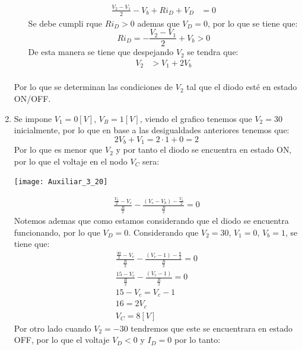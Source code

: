 \documentclass[
  11pt,
  letterpaper,
   addpoints,
   answers
  ]{exam}
\begin{document}
\begin{questions}
\begin{solution}
\begin{enumerate}
\begin{itemize}
\begin{align}
            \frac{V_{2}- V_{1}}{2} - V_{b} + Ri_{D} +V_{D}&= 0
        \end{align} 
        Se debe cumpli rque $Ri_{D} > 0 $ ademas que $V_{D} = 0$, por lo que se tiene que:
        \begin{equation}
            Ri_{D} = -\frac{V_{2}- V_{1}}{2} + V_{b} > 0 
        \end{equation}
        De esta manera se tiene que despejando $V_{2}$ se tendra que:
        \begin{align}
            V_{2} &> V_{1} + 2V_{b}\\
        \end{align}
    \end{itemize}
    Por lo que se determinan las condiciones de $V_2$ tal que el diodo esté en estado ON/OFF.
    \item Se impone $V_1 = 0 [V]$, $V_B = 1 [V]$, viendo el grafico tenemos que $V_{2}= 30$ inicialmente, por lo que en base a las desigualdades anteriores tenemos que:
    \begin{equation}
        2V_{b} + V_{1} = 2 \cdot 1 + 0 = 2 
    \end{equation}
    Por lo que es menor que $V_{2}$ y por tanto el diodo se encuentra en estado ON, por lo que el voltaje en el nodo $V_{C}$ sera:
    \begin{center}
        \texttt{[image: Auxiliar\_3\_20]}
    \end{center}
    \begin{align}
        \frac{\frac{V_{2}}{2}-V_{c}}{\frac{R}{2}} - \frac{(V_{c} - V_{b}) - \frac{V_{1}}{2}}{\frac{R}{2}}=0
    \end{align}
    Notemos ademas que como estamos considerando que el diodo se encuentra funcionando, por lo que $V_{D} = 0$. Considerando que $V_{2} = 30$, $V_{1} = 0$, $V_{b} = 1$, se tiene que:
    \begin{align}
        \frac{\frac{30}{2}-V_{c}}{\frac{R}{2}} - \frac{(V_{c} - 1) - \frac{0}{2}}{\frac{R}{2}}=0\\
        \frac{15-V_{c}}{\frac{R}{2}} - \frac{(V_{c} - 1)}{\frac{R}{2}}=0\\
        15-V_{c} = V_{c} - 1\\
        16 = 2V_{c}\\
        V_{C} = 8[V]
    \end{align}
    Por otro lado cuando $V_{2} =-30 $ tendremos que este se encuentrara en estado OFF, por lo que el voltaje $V_{D} <0$ y $I_{D}= 0$ por lo tanto:

\end{enumerate}
\end{solution}
\end{questions}
\end{document}
